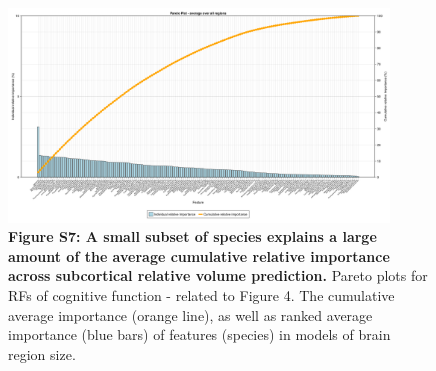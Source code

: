 \documentclass{article}
\begin{document}
\begin{figure}[h]
  \centering
  \includegraphics[width=0.9\textwidth]{assets/Supp_Figure7.png}
  \captionsetup{labelformat=empty}
  \caption{
      \textbf{Figure S7:  A small subset of species explains a large amount of the average cumulative relative importance across subcortical relative volume prediction.}
      Pareto plots for RFs of cognitive function - related to Figure 4.
      The cumulative average importance (orange line), as well as ranked average importance (blue bars)
      of features (species) in models of brain region size.
  }
\end{figure}
\end{document}
